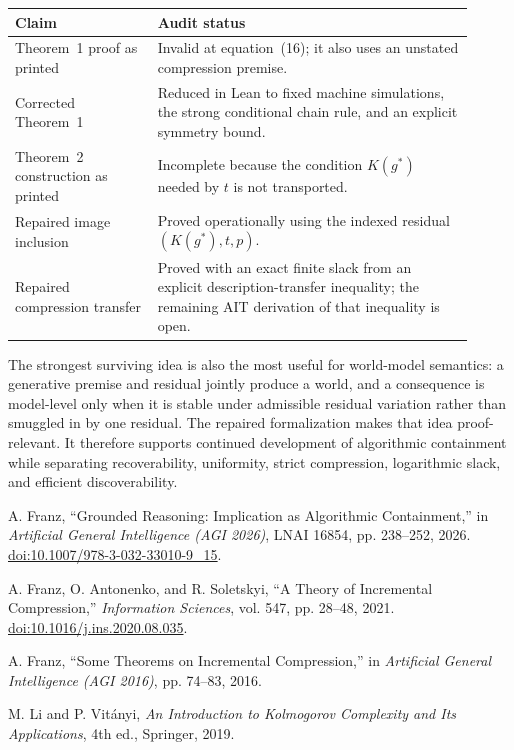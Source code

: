 \documentclass[11pt]{article}
\newcommand{\K}{K}
\begin{document}
\begin{center}
\begin{tabular}{L{0.29\linewidth}L{0.62\linewidth}}
\toprule
Claim & Audit status \\
\midrule
Theorem~1 proof as printed &
Invalid at equation~(16); it also uses an unstated compression premise. \\
Corrected Theorem~1 &
Reduced in Lean to fixed machine simulations, the strong conditional chain
rule, and an explicit symmetry bound. \\
Theorem~2 construction as printed &
Incomplete because the condition $\K(g^*)$ needed by $t$ is not transported. \\
Repaired image inclusion &
Proved operationally using the indexed residual $(\K(g^*),t,p)$. \\
Repaired compression transfer &
Proved with an exact finite slack from an explicit description-transfer
inequality; the remaining AIT derivation of that inequality is open. \\
\bottomrule
\end{tabular}
\end{center}

The strongest surviving idea is also the most useful for world-model
semantics: a generative premise and residual jointly produce a world, and a
consequence is model-level only when it is stable under admissible residual
variation rather than smuggled in by one residual.  The repaired formalization
makes that idea proof-relevant.  It therefore supports continued development
of algorithmic containment while separating recoverability, uniformity,
strict compression, logarithmic slack, and efficient discoverability.

\begin{thebibliography}{9}

A. Franz,
``Grounded Reasoning: Implication as Algorithmic Containment,''
in \emph{Artificial General Intelligence (AGI 2026)}, LNAI 16854,
pp. 238--252, 2026.
\href{https://doi.org/10.1007/978-3-032-33010-9_15}
{doi:10.1007/978-3-032-33010-9\_15}.

A. Franz, O. Antonenko, and R. Soletskyi,
``A Theory of Incremental Compression,''
\emph{Information Sciences}, vol. 547, pp. 28--48, 2021.
\href{https://doi.org/10.1016/j.ins.2020.08.035}
{doi:10.1016/j.ins.2020.08.035}.

A. Franz,
``Some Theorems on Incremental Compression,''
in \emph{Artificial General Intelligence (AGI 2016)}, pp. 74--83, 2016.

M. Li and P. Vit\'anyi,
\emph{An Introduction to Kolmogorov Complexity and Its Applications},
4th ed., Springer, 2019.

\end{thebibliography}
\end{document}
